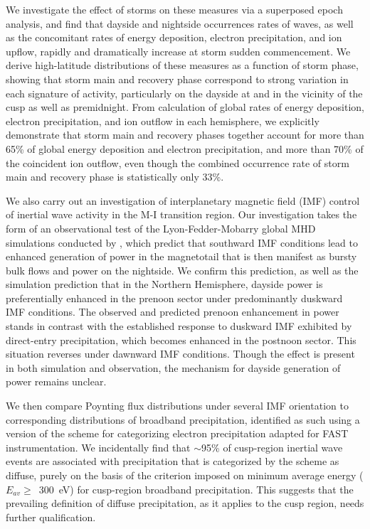 We investigate the effect of storms on these measures via a superposed
epoch analysis, and find that dayside and nightside occurrences rates
of \Alf waves, as well as the concomitant rates of energy deposition,
electron precipitation, and ion upflow, rapidly and dramatically
increase at storm sudden commencement. We derive high-latitude
distributions of these measures as a function of storm phase, showing
that storm main and recovery phase correspond to strong variation in
each signature of \Alfic activity, particularly on the dayside at and
in the vicinity of the cusp as well as premidnight. From calculation
of global rates of \Alfic energy deposition, electron precipitation,
and ion outflow in each hemisphere, we explicitly demonstrate that
storm main and recovery phases together account for more than 65\% of
global \Alfic energy deposition and electron precipitation, and more
than 70\% of the coincident ion outflow, even though the combined
occurrence rate of storm main and recovery phase is statistically only
33\%.

We also carry out an investigation of interplanetary magnetic field
(IMF) control of inertial \Alf wave activity in the M-I transition
region. Our investigation takes the form of an observational test of
the Lyon-Fedder-Mobarry global MHD simulations conducted by
\citet{Zhang2014}, which predict that southward IMF
conditions lead to enhanced generation of power in the magnetotail
that is then manifest as bursty bulk flows and \Alfic power on the
nightside. We confirm this prediction, as well as the simulation
prediction that in the Northern Hemisphere, dayside \Alfic power is
preferentially enhanced in the prenoon sector under predominantly
duskward IMF conditions. The observed and predicted prenoon
enhancement in \Alfic power stands in contrast with the established
response \citep[e.g.,][]{Zhou2000} to duskward IMF exhibited
by direct-entry precipitation, which becomes enhanced in the postnoon
sector. This situation reverses under dawnward IMF conditions. Though
the effect is present in both simulation and observation, the
mechanism for dayside generation of \Alfic power remains unclear. 

We then compare \Alfic Poynting flux distributions under several IMF
orientation to corresponding distributions of broadband precipitation,
identified as such using a version of the \citet{Newell2009}
scheme for categorizing electron precipitation adapted for FAST
instrumentation. We incidentally find that $\sim$95\% of
cusp-region inertial \Alf wave events are associated with
precipitation that is categorized by the \citet{Newell2009}
scheme as diffuse, purely on the basis of the criterion imposed on
minimum average energy ($E_{av} \geq$~300~eV) for cusp-region broadband
precipitation. This suggests that the prevailing definition of diffuse
precipitation, as it applies to the cusp region, needs further
qualification. 

